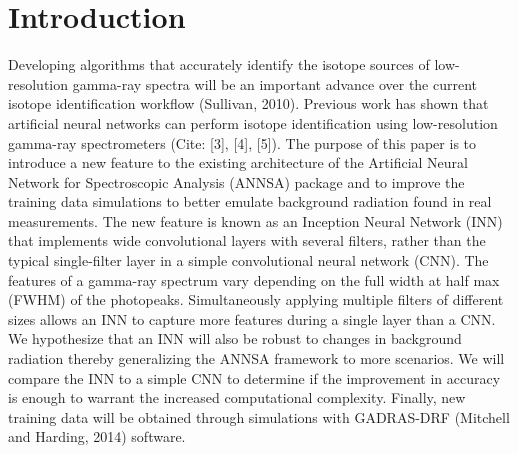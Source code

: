 \documentclass[11pt]{article}
\begin{document}
\section{Introduction}
Developing algorithms that accurately identify the isotope sources of low-resolution gamma-ray spectra will be an important advance over the current isotope identification workflow (Sullivan, 2010). Previous work has shown that artificial neural networks can perform isotope identification using low-resolution gamma-ray spectrometers (Cite: [3], [4], [5]). The purpose of this paper is to introduce a new feature to the existing architecture of the Artificial Neural Network for Spectroscopic Analysis (ANNSA) package and to improve the training data simulations to better emulate background radiation found in real measurements. The new feature is known as an Inception Neural Network (INN) that implements wide convolutional layers with several filters, rather than the typical single-filter layer in a simple convolutional neural network (CNN). The features of a gamma-ray spectrum vary depending on the full width at half max (FWHM) of the photopeaks. Simultaneously applying multiple filters of different sizes allows an INN to capture more features during a single layer than a CNN. We hypothesize that an INN will also be robust to changes in background radiation thereby generalizing the ANNSA framework to more scenarios. We will compare the INN to a simple CNN to determine if the improvement in accuracy is enough to warrant the increased computational complexity. Finally, new training data will be obtained through simulations with GADRAS-DRF (Mitchell and Harding, 2014) software.
\end{document}
